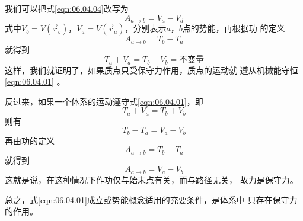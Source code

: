 我们可以把式\eqref{eqn:06.04.04}改写为
\begin{equation}\label{eqn:06.04.05}
    A _ { a \to b } = V _ { a } - V _ { d }
\end{equation}
式中$ V _ { b } = V ( \vec{ r } _ { b } ) $，$  V _ { a } = V ( \vec{ r } _ { a } ) $，分别表示$ a $，$ b $点的势能，再根据功
的定义
\begin{equation}\label{eqn:06.04.06}
    A _ { a \to b } = T _ { b } - T _ { a }
\end{equation}
就得到
\begin{equation}\label{eqn:06.04.07}
    T _ { a } + V _ { a } = T _ { b } + V _ { b } =  \text{不变量}
\end{equation}
这样，我们就证明了，如果质点只受保守力作用，质点的运动就
遵从机械能守恒\lhbrak \eqref{eqn:06.04.01} \rhbrak 。

\clearpage
反过来，如果一个体系的运动遵守式\eqref{eqn:06.04.01}，即
\begin{equation*}
    T _ { a } + V _ { a } = T _ { b } + V _ { b }
\end{equation*}
则有
\begin{equation*}
    T _ { b } - T _ { a } = V _ { a } - V _ { b }
\end{equation*}
再由功的定义
\begin{equation*}
    A _ { a \to b } = T _ { b } - T _ { a }
\end{equation*}
就得到
\begin{equation*}
    A _ { a \to b } = V _ { a } - V _ { b }
\end{equation*}
这就是说，在这种情况下作功仅与始末点有关，而与路径无关，
故力是保守力。

总之，式\eqref{eqn:06.04.01}成立或势能概念适用的充要条件，是体系中
只存在保守力的作用。
